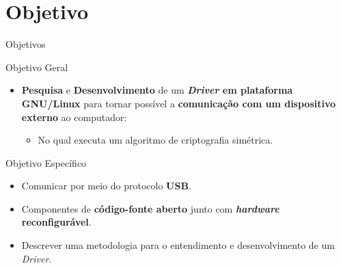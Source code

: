 
\section{Objetivo}
	\begin{frame}{Objetivos}
		\begin{block}{Objetivo Geral}
			\begin{itemize}
				\item \textbf{Pesquisa} e \textbf{Desenvolvimento} de um \textbf{\textit{Driver} em plataforma GNU/Linux} para tornar possível a \textbf{comunicação com um dispositivo externo} ao computador:
				\begin{itemize}
					\item  No qual executa um algoritmo de criptografia simétrica.
				\end{itemize}
			\end{itemize}
		\end{block}
		\bigskip
		\begin{block}{Objetivo Específico}
			\begin{itemize}
				\item Comunicar por meio do protocolo \textbf{USB}.
				\item Componentes de \textbf{código-fonte aberto} junto com \textbf{\textit{hardware} reconfigurável}.
				\item Descrever uma metodologia para o entendimento e desenvolvimento de um \textit{Driver}.
			\end{itemize}
		\end{block}
	\end{frame}


